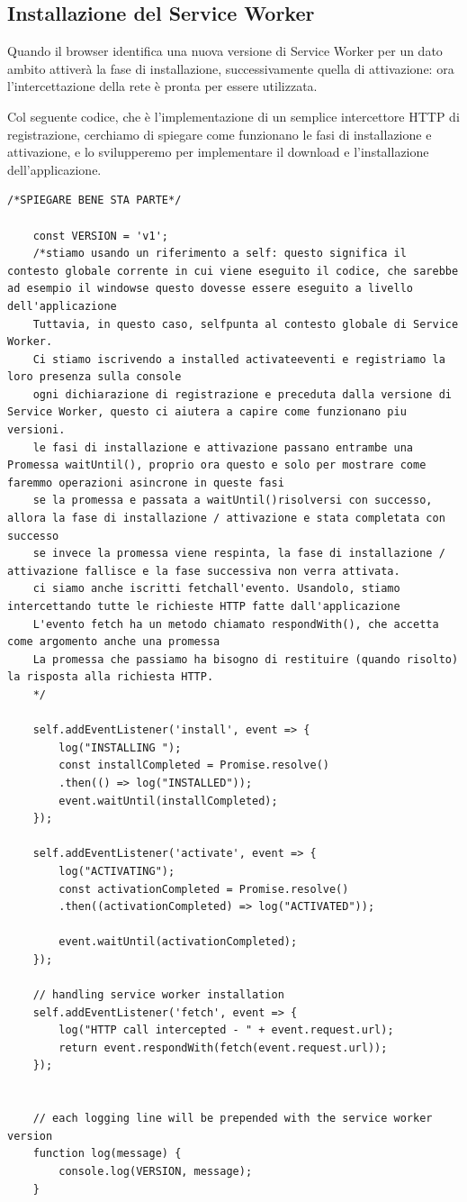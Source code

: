 \documentclass[italian]{article}
\begin{document}
\subsection{Installazione del Service Worker}
Quando il browser identifica una nuova versione di Service Worker per un dato ambito attiverà la fase di installazione, successivamente quella di attivazione: ora l'intercettazione della rete è pronta per essere utilizzata.

Col seguente codice, che è l'implementazione di un semplice intercettore HTTP di registrazione, cerchiamo di spiegare come funzionano le fasi di installazione e attivazione, e lo svilupperemo per implementare il download e l'installazione dell'applicazione.
\pagebreak
\begin{lstlisting}
/*SPIEGARE BENE STA PARTE*/

	const VERSION = 'v1';
	/*stiamo usando un riferimento a self: questo significa il contesto globale corrente in cui viene eseguito il codice, che sarebbe ad esempio il windowse questo dovesse essere eseguito a livello dell'applicazione
	Tuttavia, in questo caso, selfpunta al contesto globale di Service Worker.
	Ci stiamo iscrivendo a installed activateeventi e registriamo la loro presenza sulla console
	ogni dichiarazione di registrazione e preceduta dalla versione di Service Worker, questo ci aiutera a capire come funzionano piu versioni.
	le fasi di installazione e attivazione passano entrambe una Promessa waitUntil(), proprio ora questo e solo per mostrare come faremmo operazioni asincrone in queste fasi
	se la promessa e passata a waitUntil()risolversi con successo, allora la fase di installazione / attivazione e stata completata con successo
	se invece la promessa viene respinta, la fase di installazione / attivazione fallisce e la fase successiva non verra attivata.
	ci siamo anche iscritti fetchall'evento. Usandolo, stiamo intercettando tutte le richieste HTTP fatte dall'applicazione
	L'evento fetch ha un metodo chiamato respondWith(), che accetta come argomento anche una promessa
	La promessa che passiamo ha bisogno di restituire (quando risolto) la risposta alla richiesta HTTP.
	*/
	
	self.addEventListener('install', event => {
		log("INSTALLING ");
		const installCompleted = Promise.resolve()
		.then(() => log("INSTALLED"));
		event.waitUntil(installCompleted);
	});
	
	self.addEventListener('activate', event => {
		log("ACTIVATING");
		const activationCompleted = Promise.resolve()
		.then((activationCompleted) => log("ACTIVATED"));
		
		event.waitUntil(activationCompleted);
	});
	
	// handling service worker installation
	self.addEventListener('fetch', event => {
		log("HTTP call intercepted - " + event.request.url);
		return event.respondWith(fetch(event.request.url));
	});
	
	
	// each logging line will be prepended with the service worker version
	function log(message) {
		console.log(VERSION, message);
	}
\end{lstlisting}
\end{document}
